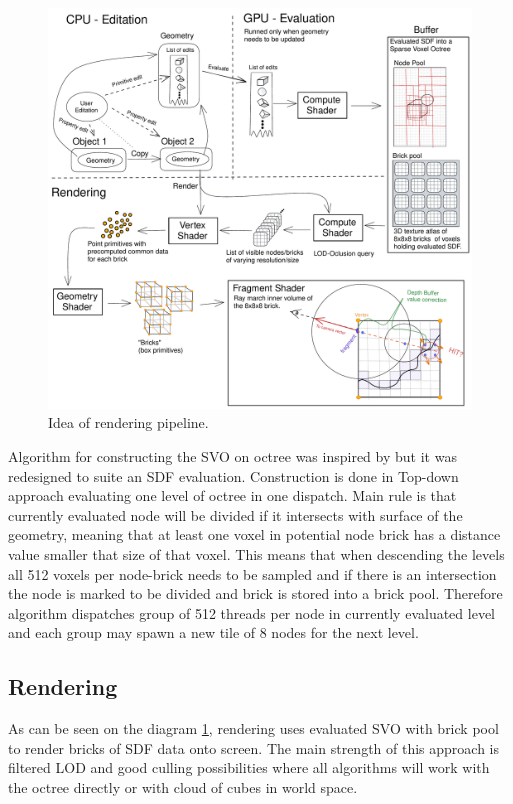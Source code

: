 \documentclass[11pt, a4paper]{article}
\begin{document}
\begin{figure}
    \centering
    \includegraphics[width=\textwidth]{desing_idea.pdf}
    \caption{Idea of rendering pipeline.}
    \label{pipeline_idea}
\end{figure}

Algorithm for constructing the SVO on octree was inspired by \cite{crassin2012} but it was redesigned to suite an SDF evaluation.
Construction is done in Top-down approach evaluating one level of octree in one dispatch.
Main rule is that currently evaluated node will be divided if it intersects with surface of the geometry, meaning that at least one voxel in potential node brick has a distance value smaller that size of that voxel.
This means that when descending the levels all 512 voxels per node-brick needs to be sampled and if there is an intersection the node is marked to be divided and brick is stored into a brick pool.
Therefore algorithm dispatches group of 512 threads per node in currently evaluated level and each group may spawn a new tile of 8 nodes for the next level.


\subsection{Rendering}
As can be seen on the diagram \ref{pipeline_idea}, rendering uses evaluated SVO with brick pool to render bricks of SDF data onto screen.
The main strength of this approach is filtered LOD and good culling possibilities where all algorithms will work with the octree directly or with cloud of cubes in world space.
\end{document}
